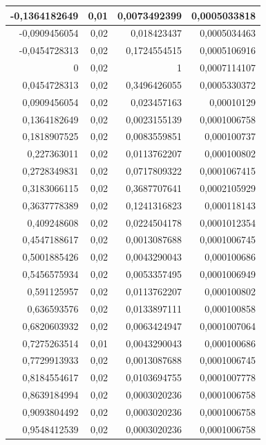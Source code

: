 \documentclass[12pt]{scrartcl}
\begin{document}
\begin{table}[htbp]
\begin{center}
\begin{tabular}{|r|r|r|r|}
-0,1364182649 & 0,01 & 0,0073492399 & 0,0005033818 \\ \hline
-0,0909456054 & 0,02 & 0,018423437 & 0,0005034463 \\ \hline
-0,0454728313 & 0,02 & 0,1724554515 & 0,0005106916 \\ \hline
0 & 0,02 & 1 & 0,0007114107 \\ \hline
0,0454728313 & 0,02 & 0,3496426055 & 0,0005330372 \\ \hline
0,0909456054 & 0,02 & 0,023457163 & 0,00010129 \\ \hline
0,1364182649 & 0,02 & 0,0023155139 & 0,0001006758 \\ \hline
0,1818907525 & 0,02 & 0,0083559851 & 0,000100737 \\ \hline
0,227363011 & 0,02 & 0,0113762207 & 0,000100802 \\ \hline
0,2728349831 & 0,02 & 0,0717809322 & 0,0001067415 \\ \hline
0,3183066115 & 0,02 & 0,3687707641 & 0,0002105929 \\ \hline
0,3637778389 & 0,02 & 0,1241316823 & 0,000118143 \\ \hline
0,409248608 & 0,02 & 0,0224504178 & 0,0001012354 \\ \hline
0,4547188617 & 0,02 & 0,0013087688 & 0,0001006745 \\ \hline
0,5001885426 & 0,02 & 0,0043290043 & 0,000100686 \\ \hline
0,5456575934 & 0,02 & 0,0053357495 & 0,0001006949 \\ \hline
0,591125957 & 0,02 & 0,0113762207 & 0,000100802 \\ \hline
0,636593576 & 0,02 & 0,0133897111 & 0,000100858 \\ \hline
0,6820603932 & 0,02 & 0,0063424947 & 0,0001007064 \\ \hline
0,7275263514 & 0,01 & 0,0043290043 & 0,000100686 \\ \hline
0,7729913933 & 0,02 & 0,0013087688 & 0,0001006745 \\ \hline
0,8184554617 & 0,02 & 0,0103694755 & 0,0001007778 \\ \hline
0,8639184994 & 0,02 & 0,0003020236 & 0,0001006758 \\ \hline
0,9093804492 & 0,02 & 0,0003020236 & 0,0001006758 \\ \hline
0,9548412539 & 0,02 & 0,0003020236 & 0,0001006758 \\ \hline
\end{tabular}
\end{center}
\label{tab:a_4_e}
\end{table}
\end{document}
